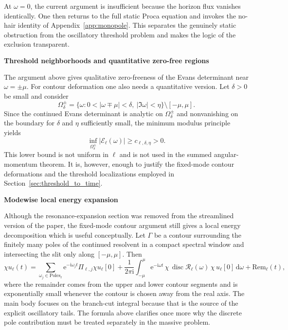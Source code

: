 \documentclass[12pt]{article}
\numberwithin{equation}{section}
\theoremstyle{plain}
\theoremstyle{definition}
\theoremstyle{remark}
\newcommand{\ii}{\mathrm i}
\newcommand{\ee}{\mathrm e}
\newcommand{\dd}{\mathrm d}
\newcommand{\disc}{\operatorname{disc}}
\newcommand{\cR}{\mathcal R}
\newcommand{\cE}{\mathcal E}
\newcommand{\om}{\omega}
\newcommand{\abs}[1]{\left|#1\right|}
\newcommand{\appheading}[1]{\par\medskip\noindent\textbf{#1}\par\smallskip\noindent}
\begin{document}
At $\om=0$, the current argument is insufficient because the horizon flux vanishes identically.  One then returns to the full static Proca equation and invokes the no-hair identity of Appendix~\ref{app:monopole}.  This separates the genuinely static obstruction from the oscillatory threshold problem and makes the logic of the exclusion transparent.

\appheading{Threshold neighborhoods and quantitative zero-free regions}

The argument above gives qualitative zero-freeness of the Evans determinant near $\om=\pm\mu$.  For contour deformation one also needs a quantitative version.  Let $\delta>0$ be small and consider
\[
   \Omega_\delta^\pm
   =
   \{\om:0<\abs{\om\mp\mu}<\delta,\ \abs{\Im\om}<\eta\}\setminus[-\mu,\mu].
\]
Since the continued Evans determinant is analytic on $\Omega_\delta^\pm$ and nonvanishing on the boundary for $\delta$ and $\eta$ sufficiently small, the minimum modulus principle yields
\begin{equation}\label{eq:appH_zero_free_bound}
   \inf_{\Omega_\delta^\pm}\abs{\cE_\ell(\om)}\ge c_{\ell,\delta,\eta}>0.
\end{equation}
This lower bound is not uniform in $\ell$ and is not used in the summed angular-momentum theorem.  It is, however, enough to justify the fixed-mode contour deformations and the threshold localizations employed in Section~\ref{sec:threshold_to_time}.

\appheading{Modewise local energy expansion}

Although the resonance-expansion section was removed from the streamlined version of the paper, the fixed-mode contour argument still gives a local energy decomposition which is useful conceptually.  Let $\Gamma$ be a contour surrounding the finitely many poles of the continued resolvent in a compact spectral window and intersecting the slit only along $[-\mu,\mu]$.  Then
\[
   \chi u_\ell(t)
   =
   \sum_{\om_j\in\mathrm{Poles}_\ell}\ee^{-\ii\om_j t}\Pi_{\ell,j}\chi u_\ell[0]
   +\frac{1}{2\pi\ii}\int_{-\mu}^{\mu}\ee^{-\ii\om t}\,\chi\,\disc\cR_\ell(\om)\,\chi\,u_\ell[0]\,\dd\om
   +\mathrm{Rem}_\ell(t),
\]
where the remainder comes from the upper and lower contour segments and is exponentially small whenever the contour is chosen away from the real axis.  The main body focuses on the branch-cut integral because that is the source of the explicit oscillatory tails.  The formula above clarifies once more why the discrete pole contribution must be treated separately in the massive problem.
\end{document}
